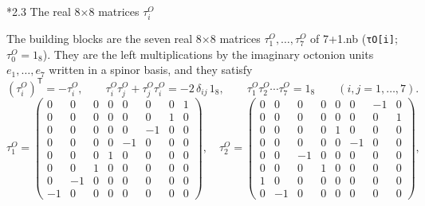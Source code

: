 \documentclass[10pt,a4paper]{article}
\makeatletter
\renewcommand\subsection{\@startsection{subsection}{2}{\z@}{-3.25ex\@plus -1ex \@minus -.2ex}{1.5ex \@plus .2ex}{\normalfont\large\bfseries\raggedright}}
\makeatother
\begin{document}
\subsection*{2.3 The real 8×8 matrices \texorpdfstring{$\tau^{O}_i$}{τOi}}
The building blocks are the seven real 8×8 matrices $\tau^{O}_1,\dots,\tau^{O}_7$ of 7+1.nb (\texttt{τO[i]}; $\tau^{O}_0=1_8$). They are the left multiplications by the imaginary octonion units $e_1,\dots,e_7$ written in a spinor basis, and they satisfy
\begin{equation*}
(\tau^{O}_i)^{\mathsf T}=-\tau^{O}_i,\qquad \tau^{O}_i\tau^{O}_j+\tau^{O}_j\tau^{O}_i=-2\,\delta_{ij}\,1_8,\qquad \tau^{O}_1\tau^{O}_2\cdots\tau^{O}_7=1_8\qquad(i,j=1,\dots,7).
\end{equation*}
\begin{equation*}
\tau^{O}_1=\begin{pmatrix}0 & 0 & 0 & 0 & 0 & 0 & 0 & 1 \\ 0 & 0 & 0 & 0 & 0 & 0 & 1 & 0 \\ 0 & 0 & 0 & 0 & 0 & -1 & 0 & 0 \\ 0 & 0 & 0 & 0 & -1 & 0 & 0 & 0 \\ 0 & 0 & 0 & 1 & 0 & 0 & 0 & 0 \\ 0 & 0 & 1 & 0 & 0 & 0 & 0 & 0 \\ 0 & -1 & 0 & 0 & 0 & 0 & 0 & 0 \\ -1 & 0 & 0 & 0 & 0 & 0 & 0 & 0\end{pmatrix},\quad \tau^{O}_2=\begin{pmatrix}0 & 0 & 0 & 0 & 0 & 0 & -1 & 0 \\ 0 & 0 & 0 & 0 & 0 & 0 & 0 & 1 \\ 0 & 0 & 0 & 0 & 1 & 0 & 0 & 0 \\ 0 & 0 & 0 & 0 & 0 & -1 & 0 & 0 \\ 0 & 0 & -1 & 0 & 0 & 0 & 0 & 0 \\ 0 & 0 & 0 & 1 & 0 & 0 & 0 & 0 \\ 1 & 0 & 0 & 0 & 0 & 0 & 0 & 0 \\ 0 & -1 & 0 & 0 & 0 & 0 & 0 & 0\end{pmatrix},
\end{equation*}
\end{document}
